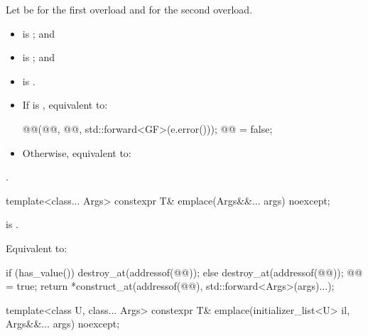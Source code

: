 \begin{itemdescr}
\pnum
Let  be  for the first overload and
 for the second overload.

\pnum
\constraints
\begin{itemize}
\item
{} is ; and
\item
{} is ; and
\item
{} is .
\end{itemize}

\pnum
\effects
\begin{itemize}
\item
If  is , equivalent to:
\begin{codeblock}
@@(@@, @@, std::forward<GF>(e.error()));
@@ = false;
\end{codeblock}
\item
Otherwise, equivalent to:
\end{itemize}

\pnum
\returns
{}.
\end{itemdescr}

%
\begin{itemdecl}
template<class... Args>
  constexpr T& emplace(Args&&... args) noexcept;
\end{itemdecl}

\begin{itemdescr}
\pnum
\constraints
{} is .

\pnum
\effects
Equivalent to:
\begin{codeblock}
if (has_value()) {
  destroy_at(addressof(@@));
} else {
  destroy_at(addressof(@@));
  @@ = true;
}
return *construct_at(addressof(@@), std::forward<Args>(args)...);
\end{codeblock}
\end{itemdescr}

%
\begin{itemdecl}
template<class U, class... Args>
  constexpr T& emplace(initializer_list<U> il, Args&&... args) noexcept;
\end{itemdecl}


